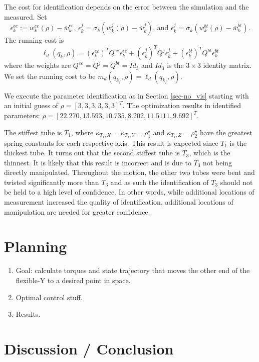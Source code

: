 \documentclass[runningheads,a4paper]{llncs}
\begin{document}
The cost for identification depends on the error between the simulation and the measured. Set
\[
\epsilon^{ee}_k := w^{ee}_k(\rho)-\overline{w}^{ee}_k \textrm{, } \epsilon^{j}_k = \sigma_k(w^j_k(\rho)-\overline{w}^j_k) \textrm{, and } \epsilon^{j}_k = \sigma_k(w^{bt}_k(\rho)-\overline{w}^{bt}_k).
\]
The running cost is 
\[
\ell_d(q_k,\rho) = (\epsilon^{ee}_k)^TQ^{ee}\epsilon^{ee}_k + (\epsilon^{j}_k)^TQ^{j}\epsilon^{j}_k + (\epsilon^{bt}_k)^TQ^{bt}\epsilon^{bt}_k
\]
where the weights are $Q^{ee} = Q^{j} = Q^{bt} = Id_{3}$ and $Id_{3}$ is the $3\times3$ identity matrix.  We set the running cost to be $m_d(q_{k_f},\rho) = \ell_d(q_{k_f},\rho)$.

We execute the parameter identification as in Section \ref{sec-no_vis} starting with an initial guess of $\rho = [3, 3, 3, 3, 3, 3]^T$. The optimization results in identified parameters: $\rho = [22.270 , 13.593 , 10.735 ,  8.202  ,11.5111,   9.692]^T$.

The stiffest tube is $T_1$, where $\kappa_{T_1,X} = \kappa_{T_1,Y} = \rho^\star_1$ and $\kappa_{T_1,Z} = \rho^\star_2$ have the greatest spring constants for each respective axis. This result is expected since $T_1$ is the thickest tube. It turns out that the second stiffest tube is $T_3$, which is the thinnest. It is likely that this result is incorrect and is due to $T_3$ not being directly manipulated. Throughout the motion, the other two tubes were bent and twisted significantly more than $T_3$ and as such the identification of $T_3$ should not be held to a high level of confidence.  In other words, while additional locations of measurement increased the quality of identification, additional locations of manipulation are needed for greater confidence.

\section{Planning}
\label{sec-plan}
\begin{enumerate}
\item Goal: calculate torques and state trajectory that moves the other end of the flexible-Y to a desired point in space.
\item Optimal control stuff.
\item Results.
\end{enumerate}

\section{Discussion / Conclusion}
\label{sec-conc}




\end{document}
